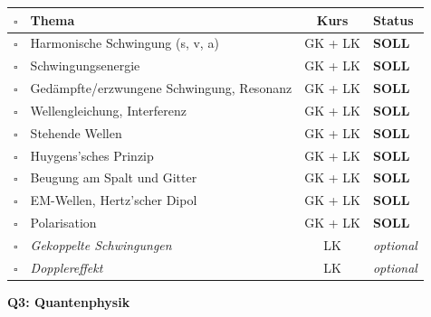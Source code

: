\documentclass[11pt,a4paper]{article}
\newcommand{\checkbox}{$\square$}
\begin{document}
\begin{tabularx}{\textwidth}{c|l|c|X}
\rowcolor{lightblue}
\checkbox & \textbf{Thema} & \textbf{Kurs} & \textbf{Status} \\
\hline
\checkbox & Harmonische Schwingung (s, v, a) & GK + LK & \textbf{SOLL} \\
\rowcolor{lightgray}
\checkbox & Schwingungsenergie & GK + LK & \textbf{SOLL} \\
\checkbox & Gedämpfte/erzwungene Schwingung, Resonanz & GK + LK & \textbf{SOLL} \\
\rowcolor{lightgray}
\checkbox & Wellengleichung, Interferenz & GK + LK & \textbf{SOLL} \\
\checkbox & Stehende Wellen & GK + LK & \textbf{SOLL} \\
\rowcolor{lightgray}
\checkbox & Huygens'sches Prinzip & GK + LK & \textbf{SOLL} \\
\checkbox & Beugung am Spalt und Gitter & GK + LK & \textbf{SOLL} \\
\rowcolor{lightgray}
\checkbox & EM-Wellen, Hertz'scher Dipol & GK + LK & \textbf{SOLL} \\
\checkbox & Polarisation & GK + LK & \textbf{SOLL} \\
\rowcolor{lightgray}
\checkbox & \textit{Gekoppelte Schwingungen} & LK & \textit{optional} \\
\checkbox & \textit{Dopplereffekt} & LK & \textit{optional} \\
\hline
\end{tabularx}

\vspace{0.4cm}

\begin{center}
\textbf{Q3: Quantenphysik}
\end{center}
\end{document}
